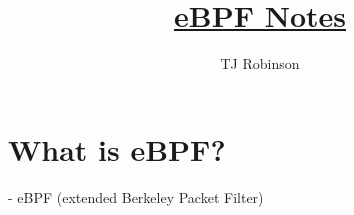 \documentclass[a4paper,13pt]{article}
\begin{document}
\title{\underline{eBPF Notes}}
\author{TJ Robinson}
\maketitle

\section{What is eBPF?}
- eBPF (extended Berkeley Packet Filter)
\end{document}
